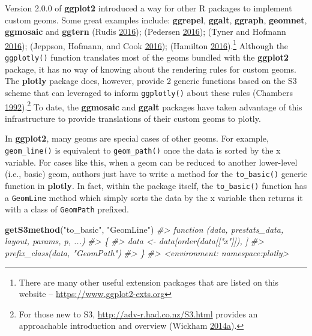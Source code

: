 \documentclass[12pt,]{isuthesis}
\newenvironment{Shaded}{\begin{snugshade}}{\end{snugshade}}
\newcommand{\KeywordTok}[1]{\textcolor[rgb]{0.13,0.29,0.53}{\textbf{{#1}}}}
\newcommand{\StringTok}[1]{\textcolor[rgb]{0.31,0.60,0.02}{{#1}}}
\newcommand{\CommentTok}[1]{\textcolor[rgb]{0.56,0.35,0.01}{\textit{{#1}}}}
\newcommand{\NormalTok}[1]{{#1}}
\let\rmarkdownfootnote\footnote%
\def\footnote{\protect\rmarkdownfootnote}
\begin{document}
Version 2.0.0 of \textbf{ggplot2} introduced a way for other R packages
to implement custom geoms. Some great examples include:
\textbf{ggrepel}, \textbf{ggalt}, \textbf{ggraph}, \textbf{geomnet},
\textbf{ggmosaic} and \textbf{ggtern} (Rudis
\protect\hyperlink{ref-ggalt}{2016}); (Pedersen
\protect\hyperlink{ref-ggraph}{2016}); (Tyner and Hofmann
\protect\hyperlink{ref-geomnet}{2016}); (Jeppson, Hofmann, and Cook
\protect\hyperlink{ref-ggmosaic}{2016}); (Hamilton
\protect\hyperlink{ref-ggtern}{2016}).\footnote{There are many other
  useful extension packages that are listed on this website --
  \url{https://www.ggplot2-exts.org}} Although the \texttt{ggplotly()}
function translates most of the geoms bundled with the \textbf{ggplot2}
package, it has no way of knowing about the rendering rules for custom
geoms. The \textbf{plotly} package does, however, provide 2 generic
functions based on the S3 scheme that can leveraged to inform
\texttt{ggplotly()} about these rules (Chambers
\protect\hyperlink{ref-S3}{1992}).\footnote{For those new to S3,
  \url{http://adv-r.had.co.nz/S3.html} provides an approachable
  introduction and overview (Wickham
  \protect\hyperlink{ref-adv-r}{2014}\protect\hyperlink{ref-adv-r}{a}).}
To date, the \textbf{ggmosaic} and \textbf{ggalt} packages have taken
advantage of this infrastructure to provide translations of their custom
geoms to plotly.

In \textbf{ggplot2}, many geoms are special cases of other geoms. For
example, \texttt{geom\_line()} is equivalent to \texttt{geom\_path()}
once the data is sorted by the x variable. For cases like this, when a
geom can be reduced to another lower-level (i.e., basic) geom, authors
just have to write a method for the \texttt{to\_basic()} generic
function in \textbf{plotly}. In fact, within the package itself, the
\texttt{to\_basic()} function has a \texttt{GeomLine} method which
simply sorts the data by the x variable then returns it with a class of
\texttt{GeomPath} prefixed.

\begin{Shaded}
\begin{Highlighting}[]
\KeywordTok{getS3method}\NormalTok{(}\StringTok{"to_basic"}\NormalTok{, }\StringTok{"GeomLine"}\NormalTok{)}
\CommentTok{#> function (data, prestats_data, layout, params, p, ...) }
\CommentTok{#> \{}
\CommentTok{#>     data <- data[order(data[["x"]]), ]}
\CommentTok{#>     prefix_class(data, "GeomPath")}
\CommentTok{#> \}}
\CommentTok{#> <environment: namespace:plotly>}
\end{Highlighting}
\end{Shaded}
\end{document}
